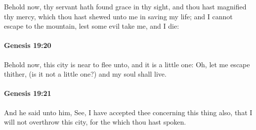 			Behold now, thy servant hath found grace in thy sight, and thou hast magnified thy mercy, which thou hast shewed unto me in saving my life; and I cannot escape to the mountain, lest some evil take me, and I die:


		\paragraph{Genesis 19:20} %
			\label{GENESIS-19-20}

			Behold now, this city is near to flee unto, and it is a little one: Oh, let me escape thither, (is it not a little one?) and my soul shall live.


		\paragraph{Genesis 19:21} %
			\label{GENESIS-19-21}

			And he said unto him, See, I have accepted thee concerning this thing also, that I will not overthrow this city, for the which thou hast spoken.


